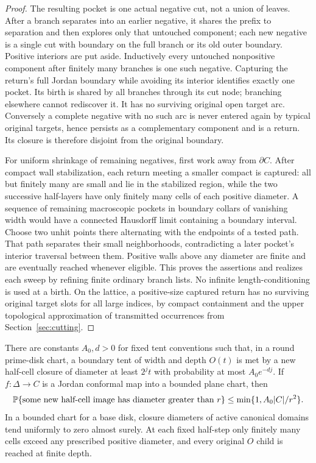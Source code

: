 \begin{proof}
The resulting pocket is one actual negative cut, not a union of leaves.  After a branch separates into an earlier negative, it shares the prefix to separation and then explores only that untouched component; each new negative is a single cut with boundary on the full branch or its old outer boundary.  Positive interiors are put aside.  Inductively every untouched nonpositive component after finitely many branches is one such negative.  Capturing the return's full Jordan boundary while avoiding its interior identifies exactly one pocket.  Its birth is shared by all branches through its cut node; branching elsewhere cannot rediscover it.  It has no surviving original open target arc.  Conversely a complete negative with no such arc is never entered again by typical original targets, hence persists as a complementary component and is a return.  Its closure is therefore disjoint from the original boundary.

For uniform shrinkage of remaining negatives, first work away from $\partial C$.  After compact wall stabilization, each return meeting a smaller compact is captured: all but finitely many are small and lie in the stabilized region, while the two successive half-layers have only finitely many cells of each positive diameter.  A sequence of remaining macroscopic pockets in boundary collars of vanishing width would have a connected Hausdorff limit containing a boundary interval.  Choose two unhit points there alternating with the endpoints of a tested path.  That path separates their small neighborhoods, contradicting a later pocket's interior traversal between them.  Positive walls above any diameter are finite and are eventually reached whenever eligible.  This proves the assertions and realizes each sweep by refining finite ordinary branch lists.  No infinite length-conditioning is used at a birth.  On the lattice, a positive-size captured return has no surviving original target slots for all large indices, by compact containment and the upper topological approximation of transmitted occurrences from Section~\ref{sec:cutting}.
\end{proof}

\begin{lemma}\label{wall:mesh}
There are constants $A_0,d>0$ for fixed tent conventions such that, in a round prime-disk chart, a boundary tent of width and depth $O(t)$ is met by a new half-cell closure of diameter at least $2^jt$ with probability at most $A_0e^{-dj}$.  If $f:\Delta\to C$ is a Jordan conformal map into a bounded plane chart, then
\begin{equation}\label{wall:image-mesh}
\mathbb P\{\text{some new half-cell image has diameter greater than }r\}
\le \min\{1,A_0|C|/r^2\}.
\end{equation}
In a bounded chart for a base disk, closure diameters of active canonical domains tend uniformly to zero almost surely.  At each fixed half-step only finitely many cells exceed any prescribed positive diameter, and every original $O$ child is reached at finite depth.
\end{lemma}


